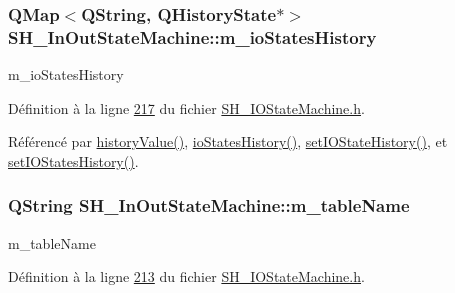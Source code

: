 \hypertarget{classSH__InOutStateMachine_aaca2ea542b3f5b4cd238396b07492455}{
\subsubsection[{m\-\_\-io\-States\-History}]{\setlength{\rightskip}{0pt plus 5cm}Q\-Map$<$Q\-String, Q\-History\-State$\ast$$>$ S\-H\-\_\-\-In\-Out\-State\-Machine\-::m\-\_\-io\-States\-History\hspace{0.3cm}{\ttfamily [protected]}}}\label{classSH__InOutStateMachine_aaca2ea542b3f5b4cd238396b07492455}


m\-\_\-io\-States\-History 



Définition à la ligne \hyperlink{SH__IOStateMachine_8h_source_l00217}{217} du fichier \hyperlink{SH__IOStateMachine_8h_source}{S\-H\-\_\-\-I\-O\-State\-Machine.\-h}.



Référencé par \hyperlink{classSH__InOutStateMachine_a84fb2b2c2105cae9c590c0d15960854a}{history\-Value()}, \hyperlink{classSH__InOutStateMachine_a4ec3ebb4c40ea57c63afdf5976e62a94}{io\-States\-History()}, \hyperlink{classSH__InOutStateMachine_a4b72e6da839782a211692a4d728c3925}{set\-I\-O\-State\-History()}, et \hyperlink{classSH__InOutStateMachine_ab35839e7880506286ebb5a11c2a924c2}{set\-I\-O\-States\-History()}.

\hypertarget{classSH__InOutStateMachine_acc0f5d5133af2dcca30939f53ec8837b}{
\subsubsection[{m\-\_\-table\-Name}]{\setlength{\rightskip}{0pt plus 5cm}Q\-String S\-H\-\_\-\-In\-Out\-State\-Machine\-::m\-\_\-table\-Name\hspace{0.3cm}{\ttfamily [protected]}}}\label{classSH__InOutStateMachine_acc0f5d5133af2dcca30939f53ec8837b}


m\-\_\-table\-Name 



Définition à la ligne \hyperlink{SH__IOStateMachine_8h_source_l00213}{213} du fichier \hyperlink{SH__IOStateMachine_8h_source}{S\-H\-\_\-\-I\-O\-State\-Machine.\-h}.



